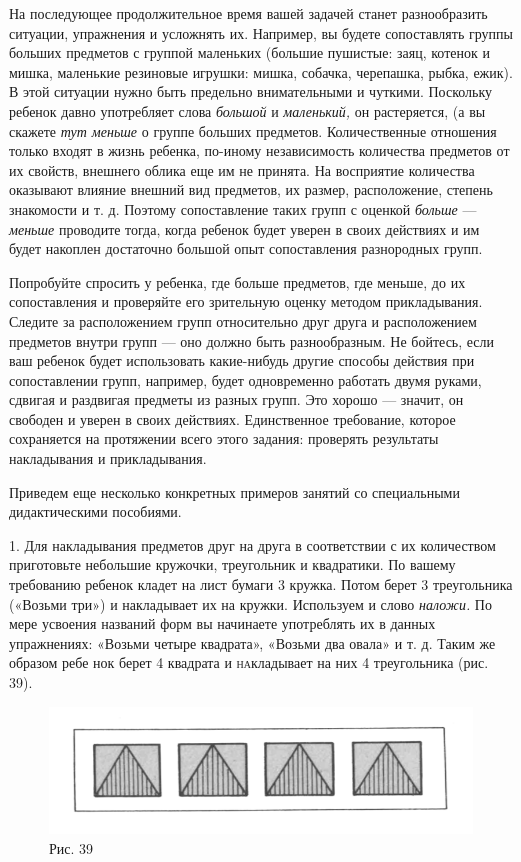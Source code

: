 \documentclass[a5paper]{book}
\renewcommand{\emph}[1]{\textit{#1}}
\begin{document}
На последующее продолжительное время вашей задачей станет разнообразить
ситуации, упражнения и усложнять их. Например, вы будете сопоставлять
группы больших предметов с группой маленьких (большие пушистые: заяц,
котенок и мишка, маленькие резиновые игрушки: мишка, собачка, черепашка,
рыбка, ежик). В этой ситуации нужно быть предельно внимательными и
чуткими. Поскольку ребенок давно употребляет слова \emph{большой} и
\emph{маленький,} он растеряется, (а вы скажете \emph{тут меньше} о
группе больших предметов. Количественные отношения только входят в жизнь
ребенка, по-иному независимость количества предметов от их свойств,
внешнего облика еще им не принята. На восприятие количества оказывают
влияние внешний вид предметов, их размер, расположение, степень
знакомости и т. д. Поэтому сопоставление таких групп с оценкой
\emph{больше} --- \emph{меньше} проводите тогда, когда ребенок будет
уверен в своих действиях и им будет накоплен достаточно большой опыт
сопоставления разнородных групп.

Попробуйте спросить у ребенка, где больше предметов, где меньше, до их
сопоставления и проверяйте его зрительную оценку методом прикладывания.
Следите за расположением групп относительно друг друга и расположением
предметов внутри групп --- оно должно быть разнообразным. Не бойтесь,
если ваш ребенок будет использовать какие-нибудь другие способы действия
при сопоставлении групп, например, будет одновременно работать двумя
руками, сдвигая и раздвигая предметы из разных групп. Это хорошо ---
значит, он свободен и уверен в своих действиях. Единственное требование,
которое сохраняется на протяжении всего этого задания: проверять
результаты накладывания и прикладывания.

Приведем еще несколько конкретных примеров занятий со специальными
дидактическими пособиями.

1. Для накладывания предметов друг на друга в соответствии с их
количеством приготовьте небольшие кружочки, треугольник и квадратики. По
вашему требованию ребенок кладет на лист бумаги 3 кружка. Потом берет 3
треугольника («Возьми три») и накладывает их на кружки. Используем и
слово \emph{наложи.} По мере усвоения названий форм вы начинаете
употреблять их в данных упражнениях: «Возьми четыре квадрата», «Возьми
два овала» и т. д. Таким же образом ребе нок берет 4 квадрата и
\textsc{на}кладывает на них 4 треугольника (рис. 39).

\begin{figure}
\centering
\includegraphics[width=\linewidth]{media/media/image36.png}
\caption*{Рис. 39}
\end{figure}
\end{document}
